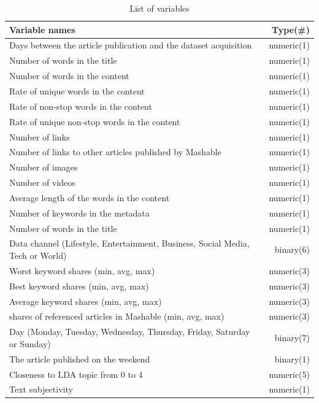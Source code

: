 \documentclass[11pt]{article}
\begin{document}
    \begin{table}[h]
        \centering
        \caption{List of variables}
        \begin{tabular}{ l | r }
            \hline\hline
            Variable names & Type(\#)\\
            \hline
            Days between the article publication and the dataset acquisition & numeric(1) \\
            Number of words in the title & numeric(1) \\
            Number of words in the content & numeric(1) \\
            Rate of unique words in the content & numeric(1) \\
            Rate of non-stop words in the content & numeric(1) \\
            Rate of unique non-stop words in the content & numeric(1) \\
            Number of links & numeric(1) \\
            Number of links to other articles published by Mashable & numeric(1) \\
            Number of images & numeric(1) \\
            Number of videos & numeric(1) \\
            Average length of the words in the content & numeric(1) \\
            Number of keywords in the metadata & numeric(1) \\
            Number of words in the title & numeric(1) \\
            Data channel (Lifestyle, Entertainment, Business, Social Media, Tech or World) & binary(6) \\
            Worst keyword shares (min, avg, max) & numeric(3) \\
            Best keyword shares (min, avg, max) & numeric(3) \\
            Average keyword shares (min, avg, max) & numeric(3) \\
            shares of referenced articles in Mashable (min, avg, max) & numeric(3) \\
            Day (Monday, Tuesday, Wednesday, Thursday, Friday, Saturday or Sunday) & binary(7) \\
            The article published on the weekend & binary(1) \\
            Closeness to LDA topic from 0 to 4 & numeric(5) \\
            Text subjectivity & numeric(1) \\

\end{tabular}
\end{table}
\end{document}
